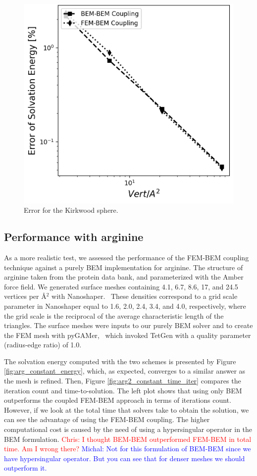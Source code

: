 \begin{figure}
  \centering
  \includegraphics[width=0.5\linewidth]{DolfinX_Sphere_const_coeff_error.png}
  \caption{Error for the Kirkwood sphere.}
  \label{fig:error_sphere}
\end{figure}

\subsection*{\sffamily \large Performance with arginine}

As a more realistic test, we assessed the performance of the FEM-BEM coupling technique against a purely BEM implementation for arginine.
The structure of arginine taken from the protein data bank, and parameterized with the Amber\cite{ponder2003force} force field. 
We generated surface meshes containing 4.1, 6.7, 8.6, 17, and 24.5 vertices per \AA$^2$ with Nanoshaper.~\cite{decherchi2013general}
These densities correspond to a grid scale parameter in Nanoshaper equal to 1.6, 2.0, 2.4, 3.4, and 4.0, respectively, where the grid scale is the reciprocal of the average characteristic length of the triangles.
The surface meshes were inputs to our purely BEM solver and to create the FEM mesh with pyGAMer,~\cite{lee2020open} which invoked TetGen\cite{hang2015tetgen} with a quality parameter (radius-edge ratio) of 1.0.

The solvation energy computed with the two schemes is presented by Figure \ref{fig:arg_constant_energy}, which, as expected, converges to a similar answer as the mesh is refined.
Then, Figure \ref{fig:arg2_constant_time_iter} compares the iteration count and time-to-solution. The left plot shows that using only BEM outperforms the coupled FEM-BEM approach in terms of iterations count. However, if we look at the total time that solvers take to obtain the solution, we can see the advantage of using the FEM-BEM coupling. The higher computational cost is caused by the need of using a hypersingular operator in the BEM formulation. \textcolor{red}{Chris: I thought BEM-BEM outperformed FEM-BEM in total time. Am I wrong there?} \textcolor{blue}{Michal: Not for this formulation of BEM-BEM since we have hypersingular operator. But you can see that for denser meshes we should outperform it.} 


